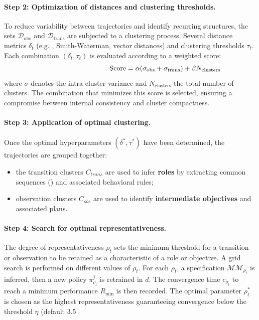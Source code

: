 \begin{itemize}
\paragraph{Step 2: Optimization of distances and clustering thresholds.}
To reduce variability between trajectories and identify recurring structures, the sets $\mathcal{D}_{\text{obs}}$ and $\mathcal{D}_{\text{trans}}$ are subjected to a clustering process.
Several distance metrics $\delta_t$ (e.g. , Smith-Waterman, vector distances) and clustering thresholds $\tau_t$.
Each combination $(\delta_t, \tau_t)$ is evaluated according to a weighted score:
\[
  \hspace{3.5cm}\text{Score} = \alpha (\sigma_{\text{obs}} + \sigma_{\text{trans}}) + \beta N_{\text{clusters}}
\]
where $\sigma$ denotes the intra-cluster variance and $N_{\text{clusters}}$ the total number of clusters.
The combination that minimizes this score is selected, ensuring a compromise between internal consistency and cluster compactness.

\paragraph{Step 3: Application of optimal clustering.}
Once the optimal hyperparameters $(\delta^*, \tau^*)$ have been determined, the trajectories are grouped together:
\begin{itemize}
  \item the transition clusters $C_{trans}$ are used to infer \textbf{roles} by extracting common sequences () and associated behavioral rules;
  \item observation clusters $C_{obs}$ are used to identify \textbf{intermediate objectives} and associated plans.
\end{itemize}

\paragraph{Step 4: Search for optimal representativeness.}
The degree of representativeness $\rho_t$ sets the minimum threshold for a transition or observation to be retained as a characteristic of a role or objective.
A grid search is performed on different values of $\rho_t$.
For each $\rho_t$, a specification $\mathcal{MM}_{\rho_t}$ is inferred, then a new policy $\pi^j_{\rho_t}$ is retrained in $d$.
The convergence time $c_{\rho_t}$ to reach a minimum performance $R_{\min}$ is then recorded.
The optimal parameter $\rho_t^*$ is chosen as the highest representativeness guaranteeing convergence below the threshold $\eta$ (default 3.5%


\end{itemize}
